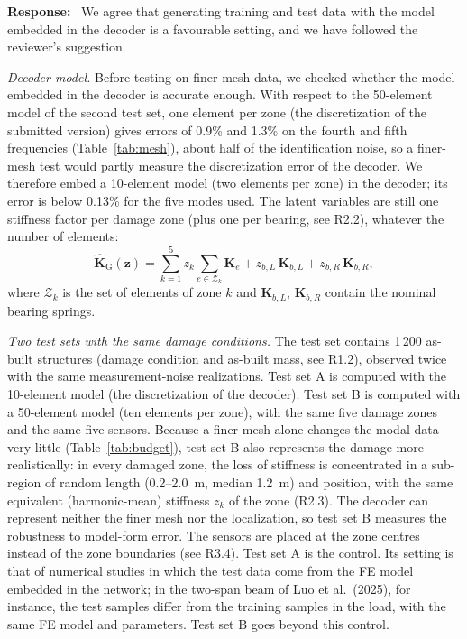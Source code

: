 \documentclass[11pt]{article}
\newenvironment{response}{\par\smallskip\noindent\color{resp}\textbf{Response:}\ }{\par}
\newcommand{\z}{\mathbf{z}}
\begin{document}
\begin{response}
We agree that generating training and test data with the model embedded in the decoder is a favourable setting, and
we have followed the reviewer's suggestion.

\textit{Decoder model.} Before testing on finer-mesh data, we checked whether the model embedded in the decoder is
accurate enough. With respect to the 50-element model of the second test set, one element per zone (the discretization
of the submitted version) gives errors of 0.9\% and 1.3\% on the fourth and fifth frequencies (Table~\ref{tab:mesh}),
about half of the identification noise, so a finer-mesh test would partly measure the discretization error of the
decoder. We therefore embed a 10-element model (two elements per zone) in the decoder; its error is below 0.13\% for the
five modes used. The latent variables are still one stiffness factor per damage zone (plus one per bearing, see R2.2),
whatever the number of elements:
\begin{equation}
\hat{\mathbf{K}}_{\mathrm{G}}(\z)=\sum_{k=1}^{5} z_k\sum_{e\in\mathcal{Z}_k}\mathbf{K}_{e}
+z_{b,L}\,\mathbf{K}_{b,L}+z_{b,R}\,\mathbf{K}_{b,R},
\label{eq:Kz}
\end{equation}
where $\mathcal{Z}_k$ is the set of elements of zone $k$ and $\mathbf{K}_{b,L}$, $\mathbf{K}_{b,R}$ contain the nominal
bearing springs.

\textit{Two test sets with the same damage conditions.} The test set contains 1\,200 as-built structures (damage
condition and as-built mass, see R1.2), observed twice with the same measurement-noise realizations. Test set A is
computed with the 10-element model (the discretization of the decoder). Test set B is computed with a 50-element model
(ten elements per zone), with the same five damage zones and the same five sensors. Because a finer mesh alone changes
the modal data very little (Table~\ref{tab:budget}), test set B also represents the damage more realistically: in every
damaged zone, the loss of stiffness is concentrated in a sub-region of random length (0.2--2.0~m, median 1.2~m) and
position, with the same equivalent (harmonic-mean) stiffness $z_k$ of the zone (R2.3). The decoder can represent
neither the finer mesh nor the localization, so test set B measures the robustness to model-form error. The sensors are
placed at the zone centres instead of the zone boundaries (see R3.4). Test set A is the control. Its setting is that of
numerical studies in which the test data come from the FE model embedded in the network; in the two-span beam of Luo et al.\
(2025), for instance, the test samples differ from the training samples in the load, with the same FE model and parameters.
Test set B goes beyond this control.


\end{response}
\end{document}

